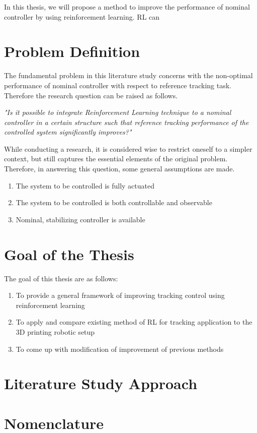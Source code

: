 In this thesis, we will propose a method to improve the performance of nominal controller by using reinforcement learning. RL can



\section{Problem Definition}
The fundamental problem in this literature study concerns with the non-optimal performance of nominal controller with respect to reference tracking task. Therefore the research question can be raised as follows.

\textit{"Is it possible to integrate Reinforcement Learning technique to a nominal controller in a certain structure such that reference tracking performance of the controlled system significantly improves?"}

While conducting a research, it is considered wise to restrict oneself to a simpler context, but still captures the essential elements of the original problem. Therefore, in answering this question, some general assumptions are made.

\begin{enumerate}
	\item The system to be controlled is fully actuated
	\item The system to be controlled is both controllable and observable
	\item Nominal, stabilizing controller is available	
\end{enumerate}

\section{Goal of the Thesis}

The goal of this thesis are as follows:
\begin{enumerate}
\item To provide a general framework of improving tracking control using reinforcement learning
\item To apply and compare existing method of RL for tracking application to the 3D printing robotic setup
\item To come up with modification of improvement of previous methods
\end{enumerate}

\section{Literature Study Approach}

\section{Nomenclature}


